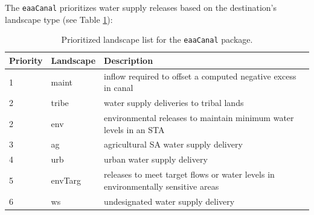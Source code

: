 The {\tt eaaCanal} prioritizes water supply releases based on the
destination's landscape type (see Table
\ref{table:eaacanalLandscape}):

\begin{table}[!htb]
 \begin{center}
  \footnotesize
  \caption{Prioritized landscape list for the {\tt eaaCanal} package. }\label{table:eaacanalLandscape}
  \begin{tabular}{p{1.0cm}p{2.0cm}p{10.0cm}}									\\[0.8ex]
   Priority	&Landscape 	&Description									\\
   \hline
   1		&maint		&inflow required to offset a computed negative excess in canal			\\
   2		&tribe		&water supply deliveries to tribal lands					\\
   2		&env		&environmental releases to maintain minimum water levels in an STA		\\
   3		&ag		&agricultural SA water supply delivery						\\
   4		&urb		&urban water supply delivery							\\
   5		&envTarg	&releases to meet target flows or water levels in environmentally sensitive areas \\
   6		&ws		&undesignated water supply delivery						\\
   \hline
  \end{tabular}
 \end{center}
\end{table}

